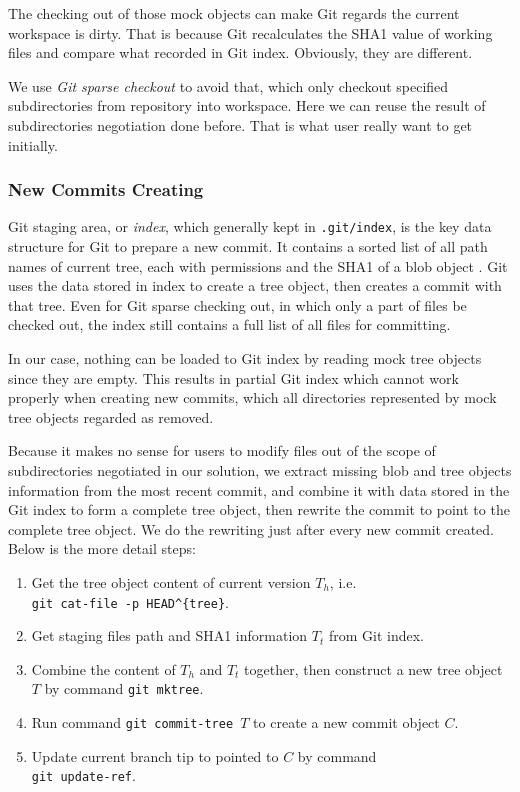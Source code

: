 \documentclass[preprint]{sigplanconf}
\begin{document}
The checking out of those mock objects can make Git regards the current
workspace is dirty.
That is because Git recalculates the SHA1 value of working files and compare
what recorded in Git index.
Obviously, they are different.

We use \emph{Git sparse checkout} \cite{sparseco} to avoid that, which only
checkout specified subdirectories from repository into workspace.
Here we can reuse the result of subdirectories negotiation done before.
That is what user really want to get initially.



\subsubsection{New Commits Creating}\label{sec:create-new-commit}
Git staging area, or \emph{index}, which generally kept in \verb|.git/index|,
is the key data structure for Git to prepare a new commit.
It contains a sorted list of all path names of current tree, each with
permissions and the SHA1 of a blob object \cite{idx-format}.
Git uses the data stored in index to create a tree object, then creates a
commit with that tree.
Even for Git sparse checking out, in which only a part of files be checked
out, the index still contains a full list of all files for committing.

In our case, nothing can be loaded to Git index by reading mock tree objects
since they are empty.
This results in partial Git index which cannot work properly when creating new
commits, which all directories represented by mock tree objects regarded as
removed.

Because it makes no sense for users to modify files out of the scope of
subdirectories negotiated in our solution, we extract missing blob and tree
objects information from the most recent commit, and combine it with data
stored in the Git index to form a complete tree object, then rewrite the commit
to point to the complete tree object.
We do the rewriting just after every new commit created.
Below is the more detail steps:

\begin{enumerate}
  \item Get the tree object content of current version $T_h$, i.e. \\
        \verb|git cat-file -p HEAD^{tree}|.
  \item Get staging files path and SHA1 information $T_t$ from Git index.
  \item Combine the content of $T_h$ and $T_t$ together, then construct a new
        tree object $T$ by command \verb|git mktree|.
  \item Run command \verb|git commit-tree |$T$ to create a new commit object
        $C$.
  \item Update current branch tip to pointed to $C$ by command \\
        \verb|git update-ref|.
\end{enumerate}
\end{document}
